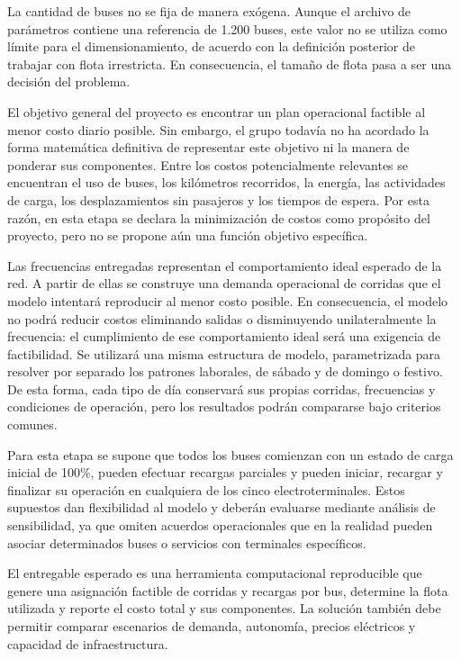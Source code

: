 La cantidad de buses no se fija de manera exógena. Aunque el archivo de
parámetros contiene una referencia de 1.200 buses, este valor no se utiliza como
límite para el dimensionamiento, de acuerdo con la definición posterior de
trabajar con flota irrestricta. En consecuencia, el tamaño de flota pasa a ser
una decisión del problema.

El objetivo general del proyecto es encontrar un plan operacional factible al
menor costo diario posible. Sin embargo, el grupo todavía no ha acordado la
forma matemática definitiva de representar este objetivo ni la manera de
ponderar sus componentes. Entre los costos potencialmente relevantes se
encuentran el uso de buses, los kilómetros recorridos, la energía, las
actividades de carga, los desplazamientos sin pasajeros y los tiempos de espera.
Por esta razón, en esta etapa se declara la minimización de costos como propósito
del proyecto, pero no se propone aún una función objetivo específica.

Las frecuencias entregadas representan el comportamiento ideal esperado de la
red. A partir de ellas se construye una demanda operacional de corridas que el
modelo intentará reproducir al menor costo posible. En consecuencia, el modelo
no podrá reducir costos eliminando salidas o disminuyendo unilateralmente la
frecuencia: el cumplimiento de ese comportamiento ideal será una exigencia de
factibilidad. Se utilizará una misma estructura de modelo, parametrizada para
resolver por separado los patrones laborales, de sábado y de domingo o festivo.
De esta forma, cada tipo de día conservará sus propias corridas, frecuencias y
condiciones de operación, pero los resultados podrán compararse bajo criterios
comunes.

Para esta etapa se supone que todos los buses comienzan con un estado de carga
inicial de 100\%, pueden efectuar recargas parciales y pueden iniciar, recargar
y finalizar su operación en cualquiera de los cinco electroterminales. Estos
supuestos dan flexibilidad al modelo y deberán evaluarse mediante análisis de
sensibilidad, ya que omiten acuerdos operacionales que en la realidad pueden
asociar determinados buses o servicios con terminales específicos.

El entregable esperado es una herramienta computacional reproducible que genere
una asignación factible de corridas y recargas por bus, determine la flota
utilizada y reporte el costo total y sus componentes. La solución también debe
permitir comparar escenarios de demanda, autonomía, precios eléctricos y
capacidad de infraestructura.


